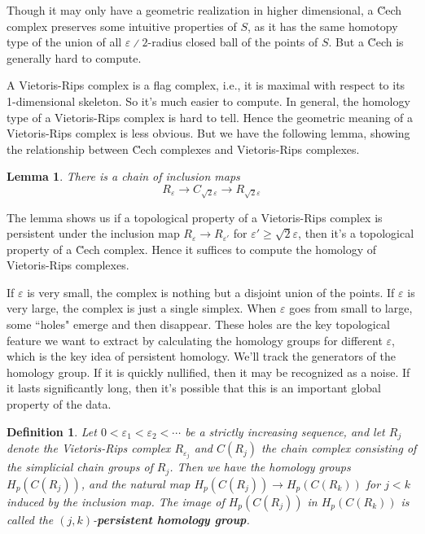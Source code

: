 \documentclass{assignment}[2019/10/15]
\theoremstyle{plain}
\newtheorem{definition}[theorem]{Definition}
\newtheorem{lemma}[theorem]{Lemma}
\renewcommand{\emph}[1]{\textbf{#1}}
\newcommand{\CECH}{\u{C}ech}
\newcommand{\DIV}{{\divslash}}
\begin{document}
  Though it may only have a geometric realization in higher dimensional, a {\CECH} complex preserves some intuitive properties of $S$, as it has the same homotopy type of the union of all $\varepsilon\DIV 2$-radius closed ball of the points of $S$. But a {\CECH} is generally hard to compute.

  A Vietoris-Rips complex is a flag complex, i.e., it is maximal with respect to its 1-dimensional skeleton. So it's much easier to compute. In general, the homology type of a Vietoris-Rips complex is hard to tell. Hence the geometric meaning of a Vietoris-Rips complex is less obvious. But we have the following lemma, showing the relationship between {\CECH} complexes and Vietoris-Rips complexes.

  \begin{lemma}
    There is a chain of inclusion maps
    \begin{equation}
      R_\varepsilon\to C_{\sqrt{2}\varepsilon}\to R_{\sqrt{2}\varepsilon}
    \end{equation}
  \end{lemma}

  The lemma shows us if a topological property of a Vietoris-Rips complex is persistent under the inclusion map $R_\varepsilon\to R_{\varepsilon'}$ for $\varepsilon'\geq \sqrt{2}\varepsilon$, then it's a topological property of a {\CECH} complex. Hence it suffices to compute the homology of Vietoris-Rips complexes.

  If $\varepsilon$ is very small, the complex is nothing but a disjoint union of the points. If $\varepsilon$ is very large, the complex is just a single simplex. When $\varepsilon$ goes from small to large, some ``holes" emerge and then disappear. These holes are the key topological feature we want to extract by calculating the homology groups for different $\varepsilon$, which is the key idea of persistent homology. We'll track the generators of the homology group. If it is quickly nullified, then it may be recognized as a noise. If it lasts significantly long, then it's possible that this is an important global property of the data.

  \begin{definition}
    Let $0<\varepsilon_1<\varepsilon_2<\dotsb$ be a strictly increasing sequence, and let $R_j$ denote the Vietoris-Rips complex $R_{\varepsilon_j}$ and $C(R_j)$ the chain complex consisting of the simplicial chain groups of $R_j$. Then we have the homology groups $H_p(C(R_j))$, and the natural map $H_p(C(R_j))\to H_p(C(R_k))$ for $j<k$ induced by the inclusion map. The image of $H_p(C(R_j))$ in $H_p(C(R_k))$ is called the $(j, k)$-\emph{persistent homology group}.
  \end{definition}
\end{document}
